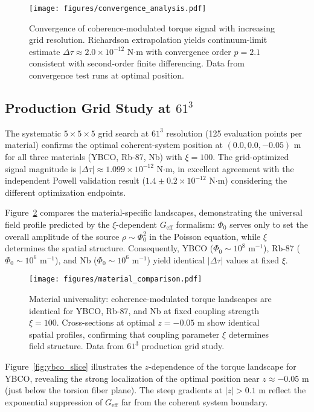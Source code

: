 \documentclass[10pt,twocolumn]{article}
\begin{document}
\begin{figure}[ht]
	\centering
	\texttt{[image: figures/convergence\_analysis.pdf]}
	\caption{Convergence of coherence-modulated torque signal with increasing grid resolution. Richardson extrapolation yields continuum-limit estimate $\Delta\tau \approx 2.0 \times 10^{-12}$ N$\cdot$m with convergence order $p = 2.1$ consistent with second-order finite differencing. Data from convergence test runs at optimal position.}
	\label{fig:convergence}
\end{figure}

\subsection{Production Grid Study at $61^3$}

The systematic $5 \times 5 \times 5$ grid search at $61^3$ resolution (125 evaluation points per material) confirms the optimal coherent-system position at $(0.0, 0.0, -0.05)$ m for all three materials (YBCO, Rb-87, Nb) with $\xi = 100$. The grid-optimized signal magnitude is $|\Delta\tau| \approx 1.099 \times 10^{-12}$ N$\cdot$m, in excellent agreement with the independent Powell validation result ($1.4 \pm 0.2 \times 10^{-12}$ N$\cdot$m) considering the different optimization endpoints.

Figure~\ref{fig:materials} compares the material-specific landscapes, demonstrating the universal field profile predicted by the $\xi$-dependent $G_{\text{eff}}$ formalism: $\Phi_0$ serves only to set the overall amplitude of the source $\rho \sim \Phi_0^2$ in the Poisson equation, while $\xi$ determines the spatial structure. Consequently, YBCO ($\Phi_0 \sim 10^8$ m$^{-1}$), Rb-87 ($\Phi_0 \sim 10^6$ m$^{-1}$), and Nb ($\Phi_0 \sim 10^6$ m$^{-1}$) yield identical $|\Delta\tau|$ values at fixed $\xi$.

\begin{figure}[ht]
	\centering
	\texttt{[image: figures/material\_comparison.pdf]}
	\caption{Material universality: coherence-modulated torque landscapes are identical for YBCO, Rb-87, and Nb at fixed coupling strength $\xi = 100$. Cross-sections at optimal $z = -0.05$ m show identical spatial profiles, confirming that coupling parameter $\xi$ determines field structure. Data from $61^3$ production grid study.}
	\label{fig:materials}
\end{figure}

Figure~\ref{fig:ybco_slice} illustrates the $z$-dependence of the torque landscape for YBCO, revealing the strong localization of the optimal position near $z \approx -0.05$ m (just below the torsion fiber plane). The steep gradients at $|z| > 0.1$ m reflect the exponential suppression of $G_{\text{eff}}$ far from the coherent system boundary.
\end{document}
